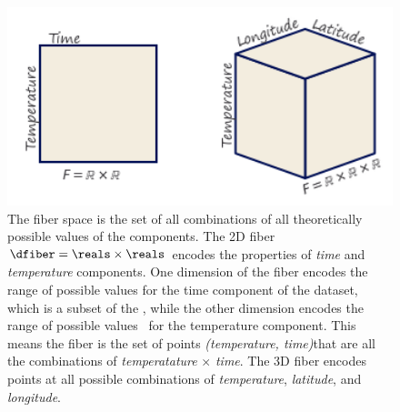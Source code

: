 \documentclass[../main.tex]{subfiles}
\begin{document}
\begin{figure}[H]
    \includegraphics[width=1\textwidth]{figures/math/fiber.png}
    \caption{The fiber space is the set of all combinations of all theoretically possible values of the components.  The 2D fiber \(\dfiber=\reals\times\reals\) encodes the properties of \textit{time} and \textit{temperature} components.  One dimension of the fiber encodes the range of possible values for the time component of the dataset, which is a subset of the \reals, while the other dimension encodes the range of possible values  \reals\ for the temperature component. This means the fiber is the set of points \textit{(temperature, time)}that are all the combinations of \textit{temperatature} $\times$ \textit{time}. The 3D fiber encodes points at all possible combinations of \textit{temperature}, \textit{latitude}, and \textit{longitude}.}
    \label{fig:math:data:fiber}
\end{figure}
\end{document}
